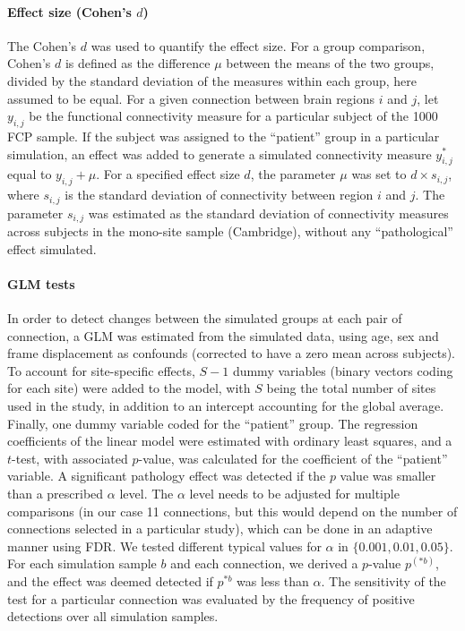 \documentclass[authoryear]{elsarticle}
\begin{document}
\paragraph{Effect size (Cohen's $d$)}
The Cohen's $d$ was used to quantify the effect size. For a group comparison, Cohen's $d$ is defined as the difference $\mu$ between the means of the two groups, divided by the standard deviation of the measures within each group, here assumed to be equal. For a given connection between brain regions $i$ and $j$, let $y_{i,j}$ be the functional connectivity measure for a particular subject of the 1000 FCP sample. If the subject was assigned to the ``patient'' group in a particular simulation, an effect was added to generate a simulated connectivity measure $y_{i,j}^*$ equal to $y_{i,j} + \mu$. For a specified effect size $d$, the parameter $\mu$ was set to $d\times s_{i,j}$, where $s_{i,j}$ is the standard deviation of connectivity between region $i$ and $j$. The parameter $s_{i,j}$ was estimated as the standard deviation of connectivity measures across subjects in the mono-site sample (Cambridge), without any ``pathological'' effect simulated.

\paragraph{GLM tests}
In order to detect changes between the simulated groups at each pair of connection, a GLM was estimated from the simulated data, using age, sex and frame displacement as confounds (corrected to have a zero mean across subjects). To account for site-specific effects, $S-1$ dummy variables (binary vectors coding for each site) were added to the model, with $S$ being the total number of sites used in the study, in addition to an intercept accounting for the global average. Finally, one dummy variable coded for the ``patient'' group. The regression coefficients of the linear model were estimated with ordinary least squares, and a $t$-test, with associated $p$-value, was calculated for the coefficient of the ``patient'' variable. A significant pathology effect was detected if the $p$ value was smaller than a prescribed $\alpha$ level. The $\alpha$ level needs to be adjusted for multiple comparisons (in our case 11 connections, but this would depend on the number of connections selected in a particular study), which can be done in an adaptive manner using FDR. We tested different typical values for $\alpha$ in $\{0.001,0.01,0.05\}$. For each simulation sample $b$ and each connection, we derived a $p$-value $p^{(*b)}$, and the effect was deemed detected if $p^{*b}$ was less than $\alpha$. The sensitivity of the test for a particular connection was evaluated by the frequency of positive detections over all simulation samples.
\end{document}
